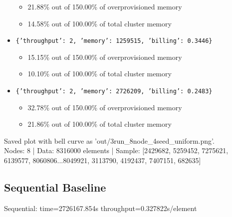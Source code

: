 \documentclass[]{interact}
\theoremstyle{plain}
\theoremstyle{definition}
\theoremstyle{remark}
\begin{document}
\begin{itemize}
    \begin{itemize}
        \item 21.88\% out of 150.00\% of overprovisioned memory
        \item 14.58\% out of 100.00\% of total cluster memory
    \end{itemize}
    \item \texttt{\{'throughput': 2, 'memory': 1259515, 'billing': 0.3446\}}
    \begin{itemize}
        \item 15.15\% out of 150.00\% of overprovisioned memory
        \item 10.10\% out of 100.00\% of total cluster memory
    \end{itemize}
    \item \texttt{\{'throughput': 2, 'memory': 2726209, 'billing': 0.2483\}}
    \begin{itemize}
        \item 32.78\% out of 150.00\% of overprovisioned memory
        \item 21.86\% out of 100.00\% of total cluster memory
    \end{itemize}
\end{itemize}
Saved plot with bell curve as 'out/3run\_8node\_4seed\_uniform.png'.\\
Nodes: 8 | Data: 8316000 elements | Sample: [2429682, 5259452, 7275621, 6139577, 8060806...8049921, 3113790, 4192437, 7407151, 682635]

\subsection{Sequential Baseline}
Sequential: time=2726167.854\textmu s throughput=0.327822\textmu s/element
\end{document}
